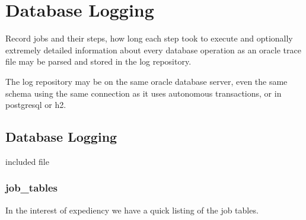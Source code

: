 \documentclass[letterpaper,10pt,english]{sphinxmanual}
\begin{document}
\section{Database Logging}
\label{index:database-logging}
Record jobs and their steps, how long each step took to execute and
optionally extremely detailed information about every database operation
as an oracle trace file may be parsed and stored in the log repository.

The log repository may be on the same oracle database server, even the
same schema using the same connection as it uses autonomous
transactions, or in postgresql or h2.


\subsection{Database Logging}
\label{databaseLogging:database-logging}\label{databaseLogging::doc}
included file


\subsubsection{job\_tables}
\label{databaseLogging:job-tables}
In the interest of expediency we have a quick listing of the job tables.
\end{document}

